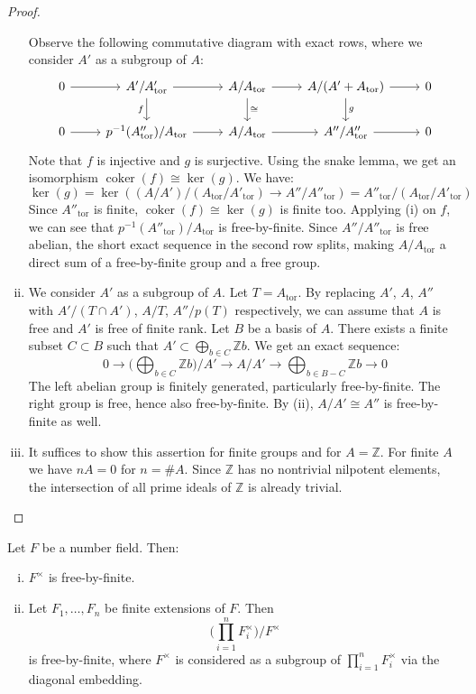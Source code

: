 \begin{proof}
\begin{enumerate}[(i)]
Observe the following commutative diagram with exact rows, where we consider $A'$ as a subgroup of $A$:
\[ \begin{tikzcd}
0 \ar[r]& A'/A'_\text{tor}\ar[r]\ar[d, "f"'] & A/A_\text{tor}\ar[r]\ar[d, "\cong"] & A/(A'+A_\text{tor}) \ar[r]\ar[d, "g"]& 0\\
0 \ar[r] & p^{-1}(A''_\text{tor})/A_\text{tor} \ar[r]& A/A_\text{tor}\ar[r] & A''/A''_\text{tor}\ar[r] & 0
\end{tikzcd} \]
Note that $f$ is injective and $g$ is surjective. Using the snake lemma, we get an isomorphism $\operatorname{coker}(f)\cong \ker(g)$. We have:
\[\ker(g) = \ker( (A/A')/(A_\text{tor}/A'_\text{tor}) \to A''/A''_\text{tor} ) = A''_\text{tor}/(A_\text{tor}/A'_\text{tor})\]
Since $A''_\text{tor}$ is finite, $\operatorname{coker}(f)\cong \ker(g)$ is finite too. Applying (i) on $f$, we can see that $p^{-1}(A''_\text{tor})/A_\text{tor}$ is free-by-finite. Since $A''/A''_\text{tor}$ is free abelian, the short exact sequence in the second row splits, making $A/A_\text{tor}$ a direct sum of a free-by-finite group and a free group.
\item We consider $A'$ as a subgroup of $A$. Let $T=A_\text{tor}$. By replacing $A'$, $A$, $A''$ with $A'/(T\cap A')$, $A/T$, $A''/p(T)$ respectively, we can assume that $A$ is free and $A'$ is free of finite rank. Let $B$ be a basis of $A$. There exists a finite subset $C\subset B$ such that $A'\subset \bigoplus_{b\in C}\mathbb{Z}b$. We get an exact sequence:
\[ 0 \longrightarrow \Big(\bigoplus_{b\in C} \mathbb{Z}b\Big)\Big/A' \longrightarrow A/A' \longrightarrow \bigoplus_{b\in B -  C}\mathbb{Z}b \longrightarrow 0 \]
The left abelian group is finitely generated, particularly free-by-finite. The right group is free, hence also free-by-finite. By (ii), $A/A'\cong A''$ is free-by-finite as well.
\item It suffices to show this assertion for finite groups and for $A=\mathbb{Z}$. For finite $A$ we have $nA = 0$ for $n = \#A$. Since $\mathbb{Z}$ has no nontrivial nilpotent elements, the intersection of all prime ideals of $\mathbb{Z}$ is already trivial. \qedhere
\end{enumerate}
\end{proof}

\begin{lemma}\label{5.3}
Let $F$ be a number field. Then:
\begin{enumerate}[(i)]
\item $F^\times$ is free-by-finite.
\item Let $F_1,\ldots,F_n$ be finite extensions of $F$. Then 
\[\Big(\prod_{i=1}^{n}F_i^\times\Big)/F^\times\] 
is free-by-finite, where $F^\times$ is considered as a subgroup of $\prod_{i=1}^{n}F_i^\times$ via the diagonal embedding.
\end{enumerate}
\end{lemma}

